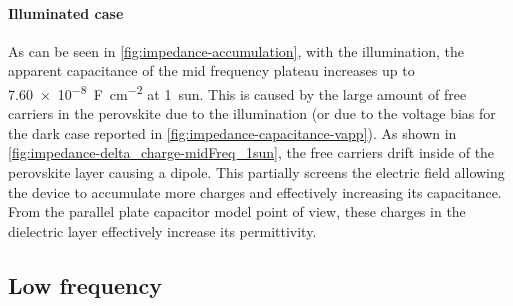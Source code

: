 
		\paragraph{Illuminated case}
		As can be seen in \cref{fig:impedance-accumulation}, with the illumination, the apparent capacitance of the mid frequency plateau increases up to \SI{7.60e-8}{\farad\per\square\cm} at \SI{1}{sun}.
		This is caused by the large amount of free carriers in the perovskite due to the illumination (or due to the voltage bias for the dark case reported in \cref{fig:impedance-capacitance-vapp}).
		As shown in \cref{fig:impedance-delta_charge-midFreq_1sun}, the free carriers drift inside of the perovskite layer causing a dipole.
		This partially screens the electric field allowing the device to accumulate more charges and effectively increasing its capacitance.
		From the parallel plate capacitor model point of view, these charges in the dielectric layer effectively increase its permittivity.

		\begin{figure}%
		\end{figure}



	\subsection{Low frequency}

